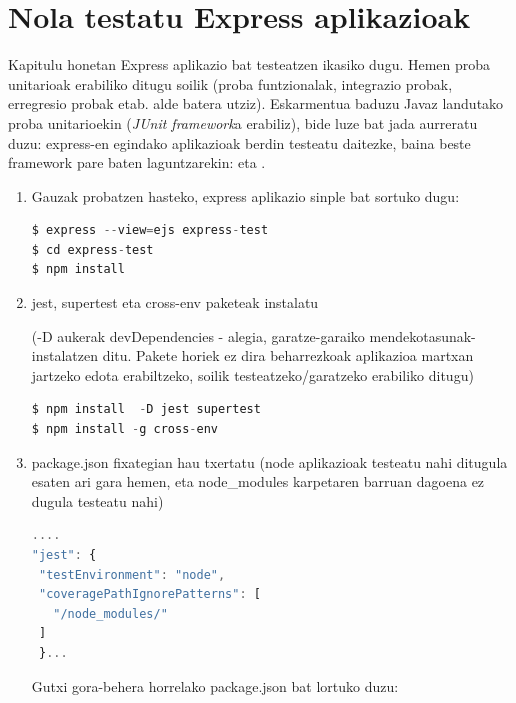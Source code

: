 \chapter{Nola testatu Express aplikazioak}

Kapitulu honetan Express aplikazio bat testeatzen ikasiko dugu. Hemen proba unitarioak erabiliko ditugu soilik (proba funtzionalak, integrazio probak, erregresio probak etab. alde batera utziz). Eskarmentua baduzu Javaz landutako proba unitarioekin (\textit{JUnit framework}a erabiliz), bide luze bat jada aurreratu duzu: express-en egindako aplikazioak berdin testeatu daitezke, baina beste framework pare baten laguntzarekin:  eta .

\begin{enumerate}

    \item Gauzak probatzen hasteko, express aplikazio sinple bat sortuko dugu:

\begin{lstlisting}[language=JavaScript,numbers=none]
$ express --view=ejs express-test
$ cd express-test
$ npm install    
\end{lstlisting}

\item 
    jest, supertest eta cross-env paketeak instalatu

(-D aukerak devDependencies - alegia, garatze-garaiko mendekotasunak- instalatzen ditu. Pakete horiek ez dira beharrezkoak aplikazioa martxan jartzeko edota erabiltzeko, soilik testeatzeko/garatzeko erabiliko ditugu)

\begin{lstlisting}[language=JavaScript,numbers=none]
$ npm install  -D jest supertest
$ npm install -g cross-env
\end{lstlisting}

\item 
package.json fixategian hau txertatu (node aplikazioak testeatu nahi ditugula esaten ari gara hemen, eta node\_modules karpetaren barruan dagoena ez dugula testeatu nahi)

\begin{lstlisting}[language=JavaScript,numbers=none]
....
"jest": {
 "testEnvironment": "node",
 "coveragePathIgnorePatterns": [
   "/node_modules/"
 ] 
 }...
\end{lstlisting}

Gutxi gora-behera horrelako package.json bat lortuko duzu:



\end{enumerate}
